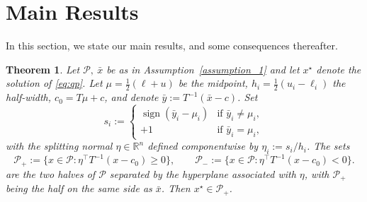\documentclass[pdflatex,sn-mathphys-num]{sn-jnl}%
\theoremstyle{thmstyleone}%
\newtheorem{theorem}{Theorem}%
\theoremstyle{thmstyletwo}%
\theoremstyle{thmstylethree}%
\theoremstyle{thmstylethree}%
\begin{document}
\section{Main Results}\label{sec2}

In this section, we state our main results, and some consequences thereafter. 

\begin{theorem}\label{thm:halfbox_affine}
Let $\mathcal P, \ \bar x
$ 
be as in Assumption~\ref{assumption_1} and let $x^\star$ denote the solution of
\eqref{eq:qp}.
Let $\mu=\frac{1}{2}(\ell+u)$ be the midpoint, $h_i=\frac{1}{2}(u_i-\ell_i)$ the half-width, $c_0=T\mu+c$, and denote $\bar y := T^{-1}(\bar x - c)$. Set
\[
s_i := \begin{cases} \operatorname{sign}(\bar{y}_i - \mu_i) & \text{if } 
\bar{y}_i \ne \mu_i, \\ +1 & \text{if } \bar{y}_i = \mu_i, \end{cases}
\]
with the splitting normal $\eta\in\mathbb R^n$ defined componentwise by
$\eta_i := s_i/h_i$.
The sets
\[
\mathcal P_+ := \bigl\{x\in\mathcal P : \eta^\top T^{-1}(x-c_0) \ge 0\bigr\},
\qquad
\mathcal P_- := \bigl\{x\in\mathcal P : \eta^\top T^{-1}(x-c_0) < 0\bigr\}.
\]
are the two halves of $\mathcal{P}$ separated by the hyperplane
associated with $\eta$, with $\mathcal{P}_+$ being the half
on the same side as $\bar{x}$.
Then $x^\star \in \mathcal{P}_+$.
\end{theorem}
\end{document}
